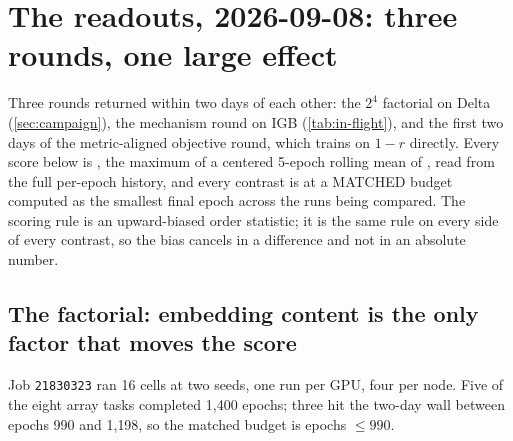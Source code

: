 
\section{The readouts, 2026-09-08: three rounds, one large effect}
\label{sec:readouts}

Three rounds returned within two days of each other: the $2^4$ factorial on Delta
(\cref{sec:campaign}), the mechanism round on IGB (\cref{tab:in-flight}), and the first
two days of the metric-aligned objective round, which trains on $1 - r$ directly. Every
score below is , the maximum of a centered 5-epoch rolling mean of
, read from the full per-epoch history, and every
contrast is at a MATCHED budget computed as the smallest final epoch across the runs being
compared. The scoring rule is an upward-biased order statistic; it is the same rule on every
side of every contrast, so the bias cancels in a difference and not in an absolute number.

\subsection{The factorial: embedding content is the only factor that moves the score
}
\label{sec:readouts-factorial}

Job \texttt{21830323} ran 16 cells at two seeds, one run per GPU, four per node. Five of
the eight array tasks completed 1{,}400 epochs; three hit the two-day wall between epochs
990 and 1{,}198, so the matched budget is epochs $\le 990$.

